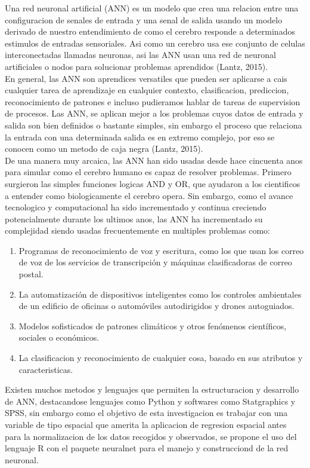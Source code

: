 Una red neuronal artificial (ANN) es un modelo que crea una relacion entre una configuracion de senales de entrada y una senal de salida usando un modelo derivado de nuestro entendimiento de como el cerebro responde a determinados estimulos de entradas sensoriales. Asi como un cerebro usa ese conjunto de celulas interconectadas llamadas neuronas, asi las ANN usan una red de neuronal artificiales o nodos para solucionar problemas aprendidos (Lantz, 2015).\\

En general, las ANN son aprendices versatiles que pueden ser aplicarse a cais cualquier tarea de aprendizaje en cualquier contexto, clasificacion, prediccion, reconocimiento de patrones e incluso pudieramos hablar de tareas de supervision de procesos. Las ANN, se aplican mejor a los problemas cuyos datos de entrada y salida son bien definidos o bastante simples, sin embargo el proceso que relaciona la entrada con una determinada salida es en extremo complejo, por eso se conocen como un metodo de caja negra (Lantz, 2015).\\

De una manera muy arcaica, las ANN han sido usadas desde hace cincuenta anos para simular como el cerebro humano es capaz de resolver problemas. Primero surgieron las simples funciones logicas AND y OR, que ayudaron a los cientificos a entender como biologicamente el cerebro opera. Sin embargo, como el avance tecnologico y computacional ha sido incrementado y continua creciendo potencialmente durante los ultimos anos, las ANN ha incrementado su complejidad siendo usadas frecuentemente en multiples problemas como:

\begin{enumerate}
    \item{Programas de reconocimiento de voz y escritura, como los que usan los correo de voz
de los servicios de transcripción y máquinas clasificadoras de correo postal.}
	\item{La automatización de dispositivos inteligentes como los controles ambientales de un edificio de oficinas o automóviles autodirigidos y drones autoguiados.}
	\item{Modelos sofisticados de patrones climáticos y otros fenómenos científicos, sociales o económicos.}
	\item{La clasificacion y reconocimiento de cualquier cosa, basado en sus atributos y caracteristicas.}
\end{enumerate} 

Existen muchos metodos y lenguajes que permiten la estructuracion y desarrollo de ANN, destacandose lenguajes como Python y softwares como Statgraphics y SPSS, sin embargo como el objetivo de esta investigacion es trabajar con una variable de tipo espacial que amerita la aplicacion de regresion espacial antes para la normalizacion de los datos recogidos y observados, se propone el uso del lenguaje  R con el paquete neuralnet para el manejo y construcciond de la red neuronal.\\

